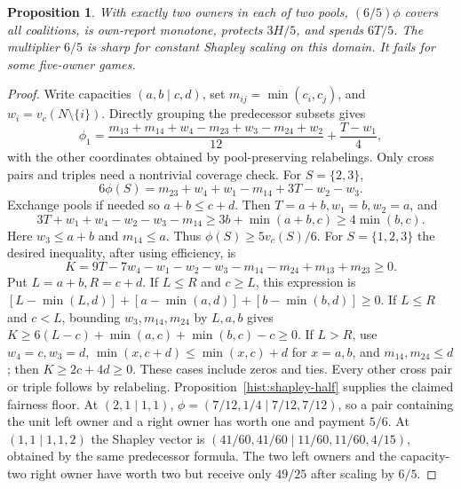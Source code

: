 \documentclass[11pt]{article}
\newtheorem{proposition}[theorem]{Proposition}
\theoremstyle{definition}\newtheorem{definition}[theorem]{Definition}
\theoremstyle{remark}\newtheorem{remark}[theorem]{Remark}
\begin{document}
\begin{proposition}\label{hist:four-shapley}
With exactly two owners in each of two pools, $(6/5)\phi$ covers all
coalitions, is own-report monotone, protects $3H/5$, and spends $6T/5$.
The multiplier $6/5$ is sharp for constant Shapley scaling on this domain.
It fails for some five-owner games.
\end{proposition}
\begin{proof}
Write capacities $(a,b\mid c,d)$, set $m_{ij}=\min(c_i,c_j)$, and
$w_i=v_c(N\setminus\{i\})$. Directly grouping the predecessor subsets gives
\[
 \phi_1=\frac{m_{13}+m_{14}+w_4-m_{23}+w_3-m_{24}+w_2}{12}
          +\frac{T-w_1}{4},
\]
with the other coordinates obtained by pool-preserving relabelings.
Only cross pairs and triples need a nontrivial coverage check.
For $S=\{2,3\}$,
\[
 6\phi(S)=m_{23}+w_4+w_1-m_{14}+3T-w_2-w_3.
\]
Exchange pools if needed so $a+b\le c+d$. Then $T=a+b,w_1=b,w_2=a$,
and
\[
 3T+w_1+w_4-w_2-w_3-m_{14}
 \ge3b+\min(a+b,c)\ge4\min(b,c).
\]
Here $w_3\le a+b$ and $m_{14}\le a$. Thus $\phi(S)\ge5v_c(S)/6$.
For $S=\{1,2,3\}$ the desired inequality, after using efficiency, is
\[
 K=9T-7w_4-w_1-w_2-w_3-m_{14}-m_{24}+m_{13}+m_{23}\ge0.
\]
Put $L=a+b,R=c+d$. If $L\le R$ and $c\ge L$, this expression is
$[L-\min(L,d)]+[a-\min(a,d)]+[b-\min(b,d)]\ge0$.
If $L\le R$ and $c<L$, bounding $w_3,m_{14},m_{24}$ by $L,a,b$ gives
$K\ge6(L-c)+\min(a,c)+\min(b,c)-c\ge0$.
If $L>R$, use $w_4=c,w_3=d$,
$\min(x,c+d)\le\min(x,c)+d$ for $x=a,b$, and $m_{14},m_{24}\le d$;
then $K\ge2c+4d\ge0$. These cases include zeros and ties.
Every other cross pair or triple follows by relabeling.
Proposition~\ref{hist:shapley-half} supplies the claimed fairness floor.
At $(2,1\mid1,1)$,
$\phi=(7/12,1/4\mid7/12,7/12)$, so a pair containing the unit left
owner and a right owner has worth one and payment $5/6$.
At $(1,1\mid1,1,2)$ the Shapley vector is
$(41/60,41/60\mid11/60,11/60,4/15)$, obtained by the same predecessor
formula. The two left owners and the capacity-two right owner have worth
two but receive only $49/25$ after scaling by $6/5$.
\end{proof}
\end{document}

